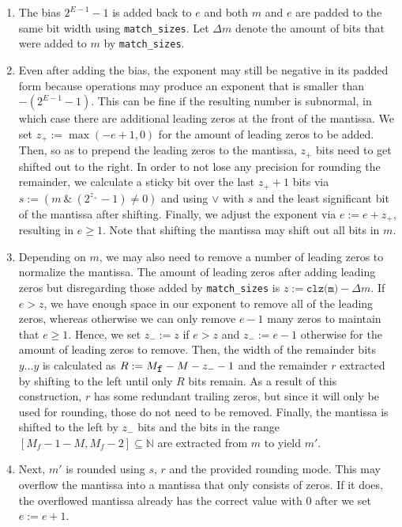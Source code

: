 \documentclass[a4paper,UKenglish,cleveref, autoref, thm-restate]{lipics-v2019}
\begin{document}
\begin{enumerate}
	\item The bias $2^{E-1}-1$ is added back to $e$ and both $m$ and $e$ are padded to the same bit width using \verb|match_sizes|. Let $\Delta m$ denote the amount of bits that were added to $m$ by \verb|match_sizes|.
	\item Even after adding the bias, the exponent may still be negative in its padded form because operations may produce an exponent that is smaller than $-(2^{E-1}-1)$. This can be fine if the resulting number is subnormal, in which case there are additional leading zeros at the front of the mantissa. We set $z_+ := \max(-e + 1, 0)$ for the amount of leading zeros to be added. Then, so as to prepend the leading zeros to the mantissa, $z_+$ bits need to get shifted out to the right. In order to not lose any precision for rounding the remainder, we calculate a sticky bit over the last $z_+ + 1$ bits via $s := (m\ \&\ (2^{z_+} - 1) \neq 0)$ and using $\lor$ with $s$ and the least significant bit of the mantissa after shifting. Finally, we adjust the exponent via $e := e + z_+$, resulting in $e \geq 1$. Note that shifting the mantissa may shift out all bits in $m$.
	\item Depending on $m$, we may also need to remove a number of leading zeros to normalize the mantissa. The amount of leading zeros after adding leading zeros but disregarding those added by \verb|match_sizes| is $z := \texttt{clz(m)} - \Delta m$. If $e > z$, we have enough space in our exponent to remove all of the leading zeros, whereas otherwise we can only remove $e - 1$ many zeros to maintain that $e \geq 1$. Hence, we set $z_- := z$ if $e > z$ and $z_- := e - 1$ otherwise for the amount of leading zeros to remove. Then, the width of the remainder bits $y \dots y$ is calculated as $R := M_{\verb|f|} - M - z_- - 1$ and the remainder $r$ extracted by shifting to the left until only $R$ bits remain. As a result of this construction, $r$ has some redundant trailing zeros, but since it will only be used for rounding, those do not need to be removed. Finally, the mantissa is shifted to the left by $z_-$ bits and the bits in the range $[M_f-1-M, M_f-2] \subseteq \mathbb{N}$ are extracted from $m$ to yield $m'$.
	\item Next, $m'$ is rounded using $s$, $r$ and the provided rounding mode. This may overflow the mantissa into a mantissa that only consists of zeros. If it does, the overflowed mantissa already has the correct value with $0$ after we set $e := e + 1$.

\end{enumerate}
\end{document}
